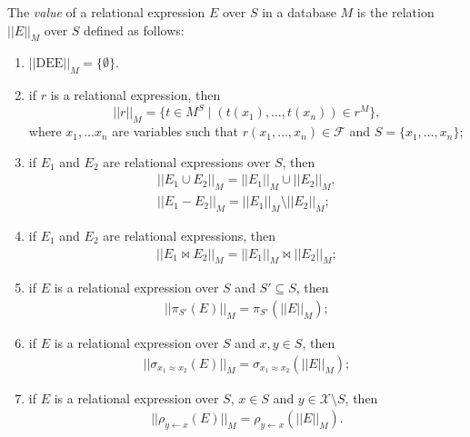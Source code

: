 \documentclass{lmcs}
\def\tu#1{( #1)}
\def\X{\mathcal X}
\def\F{\mathcal F}
\def\DEE{\textrm{DEE}}
\newcommand{\st}{%
	\ensuremath{\;|\;}
}
\begin{document}
The \emph{value} of a relational expression $E$ over $S$ in a database $M$ is the relation  $||E||_M$ over $S$ defined as follows:
\begin{enumerate}
\item $||\DEE||_M=\{\emptyset\}$.
\item if $r$ is a relational expression, then
$$||r||_M=\{t\in M^S\st \tu{t(x_1),\ldots,t(x_n)}\in r^M \},$$
 where $x_1,\ldots x_n$ are variables such that $r(x_1,\ldots,x_n)\in\F$ and $S=\{x_1,\ldots,x_n\}$;
\item if $E_1$ and $E_2$ are relational expressions over $S$, then
\begin{align*}
||E_1\cup E_2||_M=||E_1||_M\cup||E_2||_M,\\
||E_1-E_2||_M= ||E_1||_M\setminus||E_2||_M;
\end{align*}
\item if $E_1$ and $E_2$ are relational expressions, then
\begin{align*}
||E_1\bowtie E_2||_M= ||E_1||_M\bowtie||E_2||_M;
\end{align*}
\item if $E$ is a relational expression over $S$ and $S'\subseteq S$, then 
\begin{align*}
||\pi_{S'}(E)||_M= \pi_{S'}(||E||_M);
\end{align*}
\item if $E$ is a relational expression over $S$ and $x,y\in S$, then 
\begin{align*}
||\sigma_{x_1\approx x_2}(E)||_M=\sigma_{x_1\approx x_2}(||E||_M);
\end{align*}
\item if $E$ is a relational expression over $S$, $x\in S$ and $y\in \X\setminus S$, then 
\begin{align*}
||\rho_{y\leftarrow x}(E)||_M=\rho_{y\leftarrow x}(||E||_M).
\end{align*}
\end{enumerate}
\end{document}
